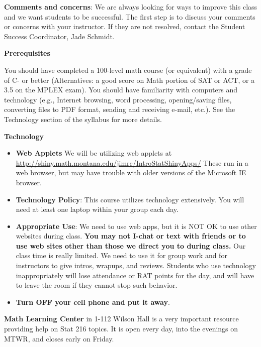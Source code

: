{\bf Comments and concerns}: We are always looking for ways to improve
this class and we want students to be successful.  The first step is
to discuss your comments or concerns with your instructor.  If they
are not resolved, contact the Student Success Coordinator, Jade
Schmidt. 


\newpage
 
{\bf Prerequisites }
 
You should have completed  a 100-level math course (or equivalent) with
a grade of C- or better (Alternatives: a good score on Math portion
of SAT or ACT, or a 3.5 on the MPLEX exam).   
 You should have familiarity with computers and technology (e.g.,
Internet browsing, word processing, opening/saving files, converting
files to PDF format, sending and receiving e-mail, etc.). See the
Technology section of the syllabus for more details.  
 


{\bf Technology} \vspace{-.3in}
\begin{itemize}
\item {\bf Web Applets}  We will be utilizing web applets 
 at \url{http://shiny.math.montana.edu/jimrc/IntroStatShinyApps/}
  These run in a web browser, but
  may have trouble with older versions of the Microsoft IE browser.
\item {\bf Technology Policy}:  This course utilizes technology
  extensively.  You will need at least one laptop within your group each
  day.
\item {\bf Appropriate Use}: We need to use web apps, but it is NOT OK
  to use other websites during class. {\bf You may not I-chat or text
    with friends or to use web sites other than those we direct you to
    during class.} Our class time is really limited. We need to use it
  for group work and for instructors to give intros, wrapups, and
  reviews.  Students who use technology inappropriately will lose
  attendance or RAT points for the day, and will have to  leave the
  room if they cannot stop such behavior.
\item {\bf Turn OFF your cell phone and put it away}.
\end{itemize}

{\bf Math Learning Center} in 1-112 Wilson Hall is a very important
resource providing  help on Stat 216 topics.
 It is open every day, into the evenings on MTWR, and closes early on
 Friday. 


